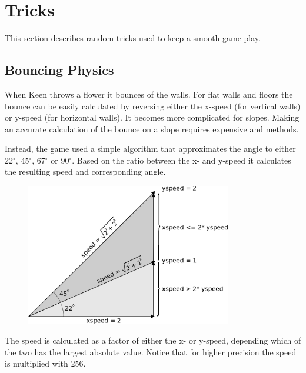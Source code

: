 \documentclass[book.tex]{subfiles}
\begin{document}
\section{Tricks}

This section describes random tricks used to keep a smooth game play. 




\subsection{Bouncing Physics}
When Keen throws a flower it bounces of the walls. For flat walls and floors the bounce can be easily calculated by reversing either the x-speed (for vertical walls) or y-speed (for horizontal walls). It becomes more complicated for slopes. Making an accurate calculation of the bounce on a slope requires expensive  and  methods. \\
\par
Instead, the game used a simple algorithm that approximates the angle to either 22$^{\circ}$, 45$^{\circ}$, 67$^{\circ}$ or 90$^{\circ}$. Based on the ratio between the x- and y-speed it calculates the resulting speed and corresponding angle. \\
\par
\begin{figure}[H]
\centering
\includegraphics[width=0.8\textwidth]{imgs/drawings/angle_0.eps}
\label{fig:angles}
\end{figure}
\par

The speed is calculated as a factor of either the x- or y-speed, depending which of the two has the largest absolute value. Notice that for higher precision the speed is multiplied with 256.\\
\par
\begin{minipage}{\textwidth}
  
\end{minipage}
\label{wallclip_array}
\par
\end{document}
